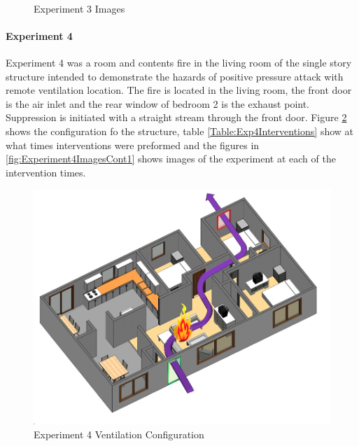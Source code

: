 \documentclass{article}
\begin{document}
\begin{figure}[H]
	\ContinuedFloat 
	\centering 
	 \ 
	\caption{Experiment 3 Images}
	\label{fig:Experiment3ImagesCont3} 
\end{figure}

\paragraph{Experiment 4}\mbox{}

Experiment 4 was a room and contents fire in the living room of the single story structure intended to demonstrate the hazards of positive pressure attack with remote ventilation location. The fire is located in the living room, the front door is the air inlet and the rear window of bedroom 2 is the exhaust point. Suppression is initiated with a straight stream through the front door. Figure \ref{fig:Exp4VentConfig} shows the configuration fo the structure, table \ref{Table:Exp4Interventions} show at what times interventions were preformed and the figures in \ref{fig:Experiment4ImagesCont1} shows images of the experiment at each of the intervention times.

\begin{figure}[H]
	\centering
	\includegraphics[width=5in]{0_Images/FireExperiments/Single_Story/Experiment_4.jpg}
	\caption{Experiment 4 Ventilation Configuration}
	\label{fig:Exp4VentConfig}
\end{figure}
\end{document}
